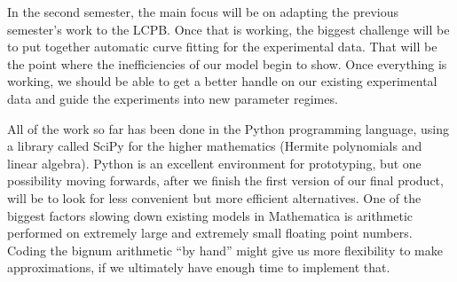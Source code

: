 \documentclass[12pt]{article}
\begin{document}
In the second semester, the main focus will be on adapting the
previous semester's work to the LCPB. Once that is working, the
biggest challenge will be to put together automatic curve fitting for
the experimental data. That will be the point where the inefficiencies
of our model begin to show. Once everything is working, we should be
able to get a better handle on our existing experimental data and
guide the experiments into new parameter regimes.

All of the work so far has been done in the Python programming
language, using a library called SciPy for the higher mathematics
(Hermite polynomials and linear algebra). Python is an excellent
environment for prototyping, but one possibility moving forwards,
after we finish the first version of our final product, will be to
look for less convenient but more efficient alternatives. One of the
biggest factors slowing down existing models in Mathematica is
arithmetic performed on extremely large and extremely small floating
point numbers. Coding the bignum arithmetic ``by hand'' might give us
more flexibility to make approximations, if we ultimately have enough
time to implement that.
\end{document}

